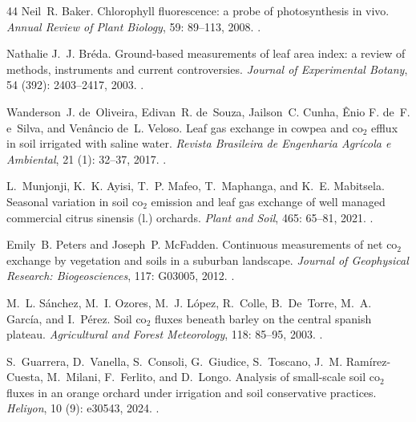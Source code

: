 \documentclass[11pt, letterpaper]{article}
\begin{document}
\begin{thebibliography}{44}
Neil~R. Baker.
\newblock Chlorophyll fluorescence: a probe of photosynthesis in vivo.
\newblock \emph{Annual Review of Plant Biology}, 59: 89--113, 2008.
\newblock {}.

Nathalie J.~J. Br{\'e}da.
\newblock Ground-based measurements of leaf area index: a review of methods, instruments and current controversies.
\newblock \emph{Journal of Experimental Botany}, 54 (392): 2403--2417, 2003.
\newblock {}.

Wanderson~J. de~Oliveira, Edivan~R. de~Souza, Jailson~C. Cunha, {\^E}nio F. de~F. e~Silva, and Ven{\^a}ncio de~L. Veloso.
\newblock Leaf gas exchange in cowpea and co$_2$ efflux in soil irrigated with saline water.
\newblock \emph{Revista Brasileira de Engenharia Agr{\'i}cola e Ambiental}, 21 (1): 32--37, 2017.
\newblock {}.

L.~Munjonji, K.~K. Ayisi, T.~P. Mafeo, T.~Maphanga, and K.~E. Mabitsela.
\newblock Seasonal variation in soil co$_2$ emission and leaf gas exchange of well managed commercial citrus sinensis (l.) orchards.
\newblock \emph{Plant and Soil}, 465: 65--81, 2021.
\newblock {}.

Emily~B. Peters and Joseph~P. McFadden.
\newblock Continuous measurements of net co$_2$ exchange by vegetation and soils in a suburban landscape.
\newblock \emph{Journal of Geophysical Research: Biogeosciences}, 117: G03005, 2012.
\newblock {}.

M.~L. S{\'a}nchez, M.~I. Ozores, M.~J. L{\'o}pez, R.~Colle, B.~De~Torre, M.~A. Garc{\'i}a, and I.~P{\'e}rez.
\newblock Soil co$_2$ fluxes beneath barley on the central spanish plateau.
\newblock \emph{Agricultural and Forest Meteorology}, 118: 85--95, 2003.
\newblock {}.

S.~Guarrera, D.~Vanella, S.~Consoli, G.~Giudice, S.~Toscano, J.~M. Ram{\'i}rez-Cuesta, M.~Milani, F.~Ferlito, and D.~Longo.
\newblock Analysis of small-scale soil co$_2$ fluxes in an orange orchard under irrigation and soil conservative practices.
\newblock \emph{Heliyon}, 10 (9): e30543, 2024.
\newblock {}.


\end{thebibliography}
\end{document}
